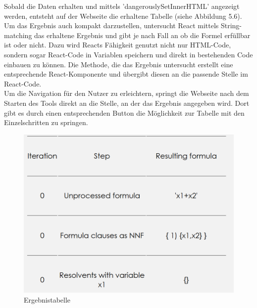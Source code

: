Sobald die Daten erhalten und mittels 'dangerouslySetInnerHTML' angezeigt werden, entsteht auf der Webseite die erhaltene Tabelle (siehe Abbildung 5.6).\\
Um das Ergebnis auch kompakt darzustellen, untersucht React mittels String-matching das erhaltene Ergebnis und gibt je nach Fall an ob die Formel erfüllbar ist oder nicht. Dazu wird Reacts Fähigkeit genutzt nicht nur HTML-Code, sondern sogar React-Code in Variablen speichern und direkt in bestehenden Code einbauen zu können. Die Methode, die das Ergebnis untersucht erstellt eine entsprechende React-Komponente und übergibt diesen an die passende Stelle im React-Code. \\
Um die Navigation für den Nutzer zu erleichtern, springt die Webseite nach dem Starten des Tools direkt an die Stelle, an der das Ergebnis angegeben wird. Dort gibt es durch einen entsprechenden Button die Möglichkeit zur Tabelle mit den Einzelschritten zu springen.
\begin{figure}[!htb]
     \centerline{\includegraphics[width=14cm]{../Abbildungen/steps.png}}
  \caption{Ergebnistabelle}
  \label{fig1_1}
\end{figure}
